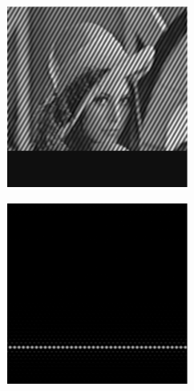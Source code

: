 \begin{figure}[ht!]
\begin{subfigure}[t]{0.23\textwidth}
      \caption{}
  \end{subfigure}\hfill
  \begin{subfigure}[t]{0.23\textwidth}
        \centering
        \includegraphics[width=\textwidth]{sim_slit/2/sim_angle_frame}
        \caption{}
    \end{subfigure}\hfill
    \begin{subfigure}[t]{0.23\textwidth}
        \centering
        \includegraphics[width=\textwidth]{sim_slit/2/sim_slit_pattern}

\end{subfigure}
\end{figure}

